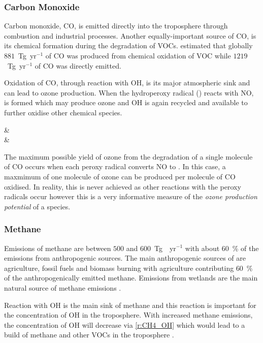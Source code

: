 \subsubsection{Carbon Monoxide}
Carbon monoxide, CO, is emitted directly into the troposphere through combustion and industrial processes.
Another equally-important source of CO, is its chemical formation during the degradation of VOCs.
\citet{Hauglustaine:1998} estimated that globally $881$~Tg~yr$^{-1}$ of CO was produced from chemical oxidation of VOC while $1219$~Tg~yr$^{-1}$ of CO was directly emitted.

Oxidation of CO, through reaction with OH, is its major atmospheric sink and can lead to ozone production.
When the hydroperoxy radical () reacts with NO,  is formed which may produce ozone and OH is again recycled and available to further oxidise other chemical species.
\begin{rxnarray}
     &   \label{r:CO_OH} \\
     & \rightarrow {} \label{r:HO2_NO}
\end{rxnarray}

The maximum possible yield of ozone from the degradation of a single molecule of CO occurs when each peroxy radical converts NO to .
In this case, a maxmimum of one molecule of ozone can be produced per molecule of CO oxidised.
In reality, this is never achieved as other reactions with the peroxy radicals occur however this is a very informative measure of the \emph{ozone production potential} of a species.

\subsubsection{Methane}
Emissions of methane are between $500$ and $600$~Tg~~yr$^{-1}$ with about $60$~\% of the emissions from anthropogenic sources.
The main anthropogenic sources of  are agriculture, fossil fuels and biomass burning with agriculture contributing $60$~\% of the anthropogenically emitted methane.
Emissions from wetlands are the main natural source of methane emissions \citep{Kirschke:2013}.

Reaction with OH is the main sink of methane and this reaction is important for the concentration of OH in the troposphere.
With increased methane emissions, the concentration of OH will decrease via \eqref{r:CH4_OH} which would lead to a build of methane and other VOCs in the troposphere \citep{Holmes:2013}.
\begin{rxnarray}
       \label{r:CH4_OH}
\end{rxnarray}

